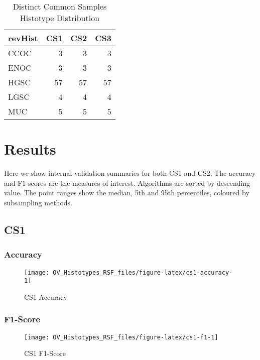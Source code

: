 \documentclass[
]{report}
\begin{document}
\begin{table}

\caption{\label{tab:common-dist-distinct}Distinct Common Samples Histotype Distribution}
\centering
\begin{tabular}[t]{l|r|r|r}
\hline
revHist & CS1 & CS2 & CS3\\
\hline
CCOC & 3 & 3 & 3\\
\hline
ENOC & 3 & 3 & 3\\
\hline
HGSC & 57 & 57 & 57\\
\hline
LGSC & 4 & 4 & 4\\
\hline
MUC & 5 & 5 & 5\\
\hline
\end{tabular}
\end{table}

\hypertarget{results}{%
\chapter{Results}\label{results}}

Here we show internal validation summaries for both CS1 and CS2. The accuracy and F1-scores are the measures of interest. Algorithms are sorted by descending value. The point ranges show the median, 5th and 95th percentiles, coloured by subsampling methods.

\hypertarget{cs1}{%
\section{CS1}\label{cs1}}

\hypertarget{accuracy}{%
\subsection{Accuracy}\label{accuracy}}

\begin{figure}[H]

{\centering \texttt{[image: OV\_Histotypes\_RSF\_files/figure-latex/cs1-accuracy-1]} 

}

\caption{CS1 Accuracy}\label{fig:cs1-accuracy}
\end{figure}

\hypertarget{f1-score}{%
\subsection{F1-Score}\label{f1-score}}

\begin{figure}[H]

{\centering \texttt{[image: OV\_Histotypes\_RSF\_files/figure-latex/cs1-f1-1]} 

}

\caption{CS1 F1-Score}\label{fig:cs1-f1}
\end{figure}
\end{document}
